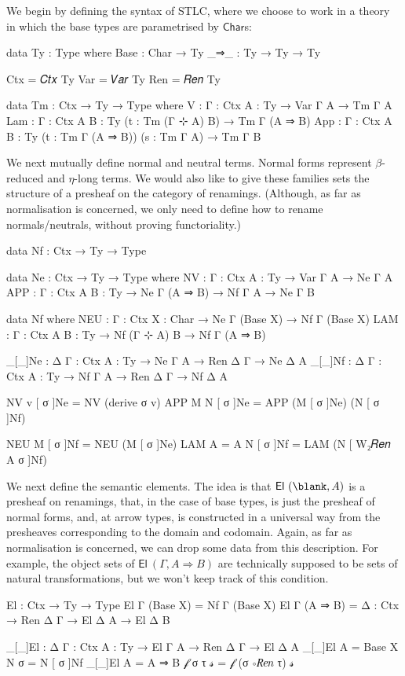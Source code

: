 We begin by defining the syntax of STLC, where we choose to work in a theory in
which the base types are parametrised by $\textsf{Char}$s:
\begin{code}
data Ty : Type where
  Base : Char → Ty
  _⇒_ : Ty → Ty → Ty

Ctx = 𝐶𝑡𝑥 Ty
Var = 𝑉𝑎𝑟 Ty
Ren = 𝑅𝑒𝑛 Ty

data Tm : Ctx → Ty → Type where
  V : {Γ : Ctx} {A : Ty} → Var Γ A → Tm Γ A
  Lam : {Γ : Ctx} {A B : Ty} (t : Tm (Γ ⊹ A) B) → Tm Γ (A ⇒ B)
  App : {Γ : Ctx} {A B : Ty} (t : Tm Γ (A ⇒ B)) (s : Tm Γ A) → Tm Γ B
\end{code}
\noindent
We next mutually define normal and neutral terms. Normal forms represent
$\beta$-reduced and $\eta$-long terms. We would also like to give these families
sets the structure of a presheaf on the category of renamings. (Although, as far
as normalisation is concerned, we only need to define how to rename
normals/neutrals, without proving functoriality.)
\begin{code}
data Nf : Ctx → Ty → Type

data Ne : Ctx → Ty → Type where
  NV : {Γ : Ctx} {A : Ty} → Var Γ A → Ne Γ A
  APP : {Γ : Ctx} {A B : Ty} → Ne Γ (A ⇒ B) → Nf Γ A → Ne Γ B

data Nf where
  NEU : {Γ : Ctx} {X : Char} → Ne Γ (Base X) → Nf Γ (Base X)
  LAM : {Γ : Ctx} {A B : Ty} → Nf (Γ ⊹ A) B → Nf Γ (A ⇒ B)

_[_]Ne : {Δ Γ : Ctx} {A : Ty} → Ne Γ A → Ren Δ Γ → Ne Δ A
_[_]Nf : {Δ Γ : Ctx} {A : Ty} → Nf Γ A → Ren Δ Γ → Nf Δ A

NV v [ σ ]Ne = NV (derive σ v)
APP M N [ σ ]Ne = APP (M [ σ ]Ne) (N [ σ ]Nf)

NEU M [ σ ]Nf = NEU (M [ σ ]Ne)
LAM {A = A} N [ σ ]Nf = LAM (N [ W₂𝑅𝑒𝑛 A σ ]Nf)
\end{code}
\noindent
We next define the semantic elements. The idea is that $\mathsf{El}~(\blank,A)$
is a presheaf on renamings, that, in the case of base types, is just the
presheaf of normal forms, and, at arrow types, is constructed in a universal way
from the presheaves corresponding to the domain and codomain. Again, as far as
normalisation is concerned, we can drop some data from this description. For
example, the object sets of $\mathsf{El}~(\Gamma , A \Rightarrow B)$ are
technically supposed to be sets of natural transformations, but we won't keep
track of this condition.
\begin{code}
El : Ctx → Ty → Type
El Γ (Base X) = Nf Γ (Base X)
El Γ (A ⇒ B) = {Δ : Ctx} → Ren Δ Γ → El Δ A → El Δ B

_[_]El : {Δ Γ : Ctx} {A : Ty} → El Γ A → Ren Δ Γ → El Δ A
_[_]El {A = Base X} N σ = N [ σ ]Nf
_[_]El {A = A ⇒ B} 𝒻 σ τ 𝓈 = 𝒻 (σ ∘𝑅𝑒𝑛 τ) 𝓈
\end{code}
